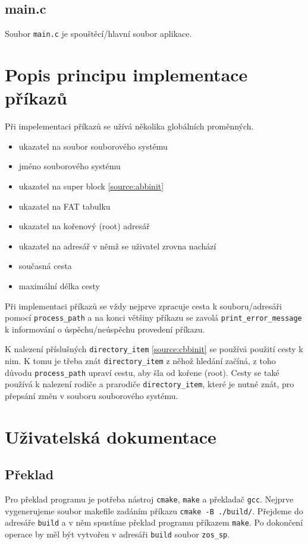 \documentclass[12pt]{report}
\begin{document}
	\subsection*{main.c}
	\par Soubor \texttt{main.c} je spouštěcí/hlavní soubor aplikace.

	\section*{Popis principu implementace příkazů}
	\par Při impelementaci příkazů se užívá několika globálních proměnných.
	\begin{itemize}
		\item ukazatel na soubor souborového systému
		\item jméno souborového systému
		\item ukazatel na super block \ref{source:abbinit}
		\item ukazatel na FAT tabulku
		\item ukazatel na kořenový (root) adresář
		\item ukazatel na adresář v němž se uživatel zrovna nachází
		\item současná cesta
		\item maximální délka cesty
	\end{itemize}
	\par Při implementaci příkazů se vždy nejprve zpracuje cesta k souboru/adresáři pomocí \texttt{process\_path} a na konci většiny příkazu se zavolá \texttt{print\_error\_message} k informování o úspěchu/neúspěchu provedení příkazu.
	\par K nalezení příslušných \texttt{directory\_item} \ref{source:cbbinit} se používá použití cesty k nim. K tomu je třeba znát \texttt{directory\_item} z něhož hledání začíná, z toho důvodu \texttt{process\_path} upraví cestu, aby šla od kořene (root). Cesty se také používá k nalezení rodiče a prarodiče \texttt{directory\_item}, které je nutné znát, pro přepsání změn v souboru souborového systému.
	
	\section*{Uživatelská dokumentace}
	\subsection*{Překlad}
	\par Pro překlad programu je potřeba nástroj \texttt{cmake}, \texttt{make} a překladač \texttt{gcc}. Nejprve vygenerujeme soubor makefile zadáním příkazu \texttt{cmake -B ./build/}. Přejdeme do adresáře \texttt{build} a v něm spustíme překlad programu příkazem \texttt{make}. Po dokončení operace by měl být vytvořen v adresáři \texttt{build} soubor \texttt{zos\_sp}. 
	
\end{document}
